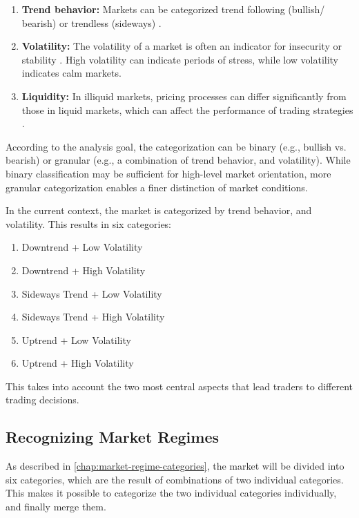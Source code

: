 \begin{enumerate}
    \item \textbf{Trend behavior:} Markets can be categorized trend following (bullish/ bearish) or trendless (sideways) \cite{regime-trend}.
    \item \textbf{Volatility:} The volatility of a market is often an indicator for insecurity or stability \cite{regime-vola}.
    High volatility can indicate periods of stress, while low volatility indicates calm markets.
    \item \textbf{Liquidity:} In illiquid markets, pricing processes can differ significantly from those in liquid markets, which can affect the performance of trading strategies \cite{regime-liq}.
\end{enumerate}

\noindent
According to the analysis goal, the categorization can be binary (e.g., bullish vs. bearish) or granular (e.g., a combination of trend behavior, and volatility).
While binary classification may be sufficient for high-level market orientation, more granular categorization enables a finer distinction of market conditions.

In the current context, the market is categorized by trend behavior, and volatility.
This results in six categories:

\newpage
\begin{enumerate}
    \item Downtrend + Low Volatility
    \item Downtrend + High Volatility
    \item Sideways Trend + Low Volatility
    \item Sideways Trend + High Volatility
    \item Uptrend + Low Volatility
    \item Uptrend + High Volatility
\end{enumerate}

\noindent
This takes into account the two most central aspects that lead traders to different trading decisions.

\subsection{Recognizing Market Regimes}

As described in \autoref{chap:market-regime-categories}, the market will be divided into six categories, which are the result of combinations of two individual categories.
This makes it possible to categorize the two individual categories individually, and finally merge them.

